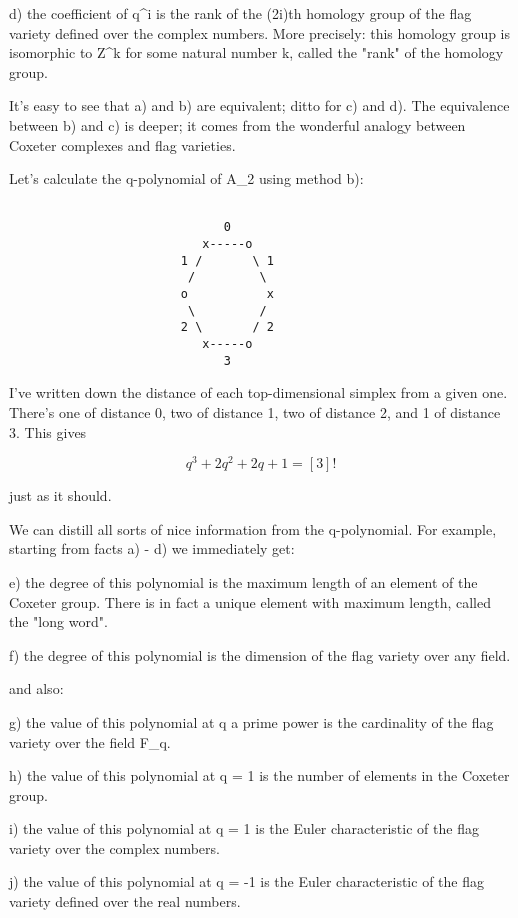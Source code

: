 d) the coefficient of q^{i} is the rank of the (2i)th homology group of
the flag variety defined over the complex numbers.  More precisely:
this homology group is isomorphic to Z^{k} for some natural number k,
called the "rank" of the homology group.

It's easy to see that a) and b) are equivalent; ditto for c) and d).
The equivalence between b) and c) is deeper; it comes from the 
wonderful analogy between Coxeter complexes and flag varieties.  

Let's calculate the q-polynomial of A_{2} using method b):
                

\begin{verbatim}

                              0
                           x-----o
                        1 /       \ 1
                         /         \
                        o           x
                         \         /
                        2 \       / 2
                           x-----o
                              3
\end{verbatim}
    
I've written down the distance of each top-dimensional simplex
from a given one.  There's one of distance 0, two of distance 1,
two of distance 2, and 1 of distance 3.  This gives


$$

q^{3} + 2q^{2} + 2q + 1 =  [3]!
$$
    
just as it should.

We can distill all sorts of nice information from the q-polynomial.
For example, starting from facts a) - d) we immediately get:

e) the degree of this polynomial is the maximum length of an element
of the Coxeter group.  There is in fact a unique element with maximum
length, called the "long word".

f) the degree of this polynomial is the dimension of the flag variety
over any field. 

and also:

g) the value of this polynomial at q a prime power is the cardinality
of the flag variety over the field F_{q}.

h) the value of this polynomial at q = 1 is the number of elements
in the Coxeter group.

i) the value of this polynomial at q = 1 is the Euler characteristic
of the flag variety over the complex numbers.

j) the value of this polynomial at q = -1 is the Euler characteristic
of the flag variety defined over the real numbers.

